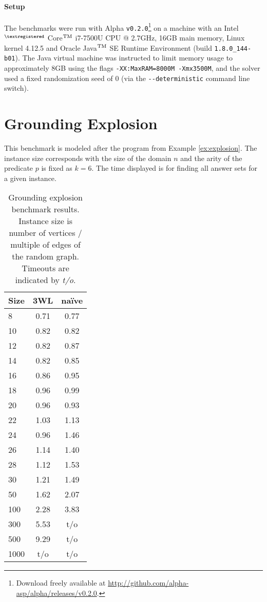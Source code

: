 \documentclass{vutinfth} %
\begin{document}
\paragraph{Setup} The benchmarks were run with Alpha \texttt{v0.2.0}\footnote{Download freely available at \url{http://github.com/alpha-asp/alpha/releases/v0.2.0}.} on a machine with an Intel$^{\tiny{\textregistered}}$ Core$^{\tiny{\text{TM}}}$ i7-7500U CPU @ 2.7GHz, 16GB main memory, Linux kernel 4.12.5 and Oracle Java$^{\tiny{\text{TM}}}$ SE Runtime Environment (build \texttt{1.8.0\_144-b01}). The Java virtual machine was instructed to limit memory usage to approximately 8GB using the flags \texttt{-XX:MaxRAM=8000M -Xmx3500M}, and the solver used a fixed randomization seed of 0 (via the \texttt{-{}-deterministic} command line switch).

\section{Grounding Explosion}

This benchmark is modeled after the program from Example \ref{ex:explosion}. The instance size corresponds with the size of the domain $n$ and the arity of the predicate $p$ is fixed as $k = 6$. The time displayed is for finding all answer sets for a given instance.

\begin{table}
\begin{center}
\begin{tabular}{|l|c|c|}
\hline
Size & 3WL & na\"{i}ve \\ 
\hline
   8 & 0.71 & 0.77\\
  10 & 0.82 & 0.82\\
  12 & 0.82 & 0.87\\
  14 & 0.82 & 0.85\\
  16 & 0.86 & 0.95\\
  18 & 0.96 & 0.99\\
  20 & 0.96 & 0.93\\
  22 & 1.03 & 1.13\\
  24 & 0.96 & 1.46\\
  26 & 1.14 & 1.40\\
  28 & 1.12 & 1.53\\
  30 & 1.21 & 1.49\\
  50 & 1.62 & 2.07\\
 100 & 2.28 & 3.83\\
 300 & 5.53 & t/o\\
 500 & 9.29 & t/o\\
1000 &  t/o & t/o\\
\hline
\end{tabular}
\end{center}
\caption{Grounding explosion benchmark results. Instance size is number of vertices / multiple of edges of the random graph. Timeouts are indicated by \emph{t/o}.}
\end{table}
\end{document}
